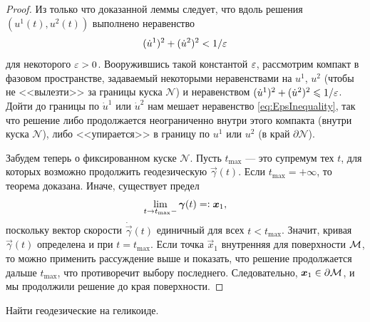 \begin{proof}
	Из только что доказанной леммы следует, что вдоль решения $(u^1(t), u^2(t))$ выполнено неравенство
	\begin{equation} \label{eq:EpsInequality}
		(\dot{u}^1)^2 + (\dot{u}^2)^2 < 1 / \eps
	\end{equation}
	для некоторого $\eps > 0$. Вооружившись такой константой $\eps$, рассмотрим компакт в фазовом пространстве, задаваемый некоторыми неравенствами на $u^1$, $u^2$ (чтобы не <<вылезти>> за границы куска $\mathcal{N}$) и неравенством $(\dot{u}^1)^2 + (\dot{u}^2)^2 \leqslant 1 / \eps$. Дойти до границы по $\dot{u}^1$ или $\dot{u}^2$ нам мешает неравенство \eqref{eq:EpsInequality}, так что решение либо продолжается неограниченно внутри этого компакта (внутри куска $\mathcal{N}$), либо <<упирается>> в границу по $u^1$ или $u^2$ (в край $\partial\mathcal{N}$).

	Забудем теперь о фиксированном куске $\mathcal{N}$. Пусть $t_{\max}$ --- это супремум тех $t$, для которых возможно продолжить геодезическую $\vec{\gamma}(t)$. Если $t_{\max} = +\infty$, то теорема доказана. Иначе, существует предел
	\[
		\lim_{t \to t_{\max}-}\vec{\gamma}(t) = \vcentcolon \vec{x}_1,
	\]
	поскольку вектор скорости $\dot{\vec{\gamma}}(t)$ единичный для всех $t < t_{\max}$. Значит, кривая $\vec{\gamma}(t)$ определена и при $t = t_{\max}$. Если точка $\vec{x}_1$ внутренняя для поверхности $\M$, то можно применить рассуждение выше и показать, что решение продолжается дальше $t_{\max}$, что противоречит выбору последнего. Следовательно, $\vec{x}_1 \in \partial\M$, и мы продолжили решение до края поверхности.
\end{proof}


\begin{problem} \label{problem:GeoHeli}
	Найти геодезические на геликоиде.
\end{problem}


